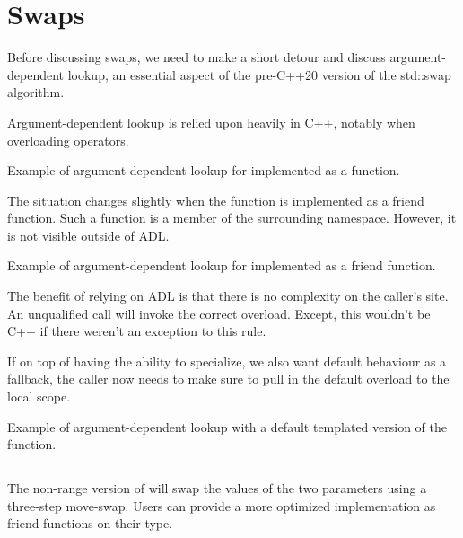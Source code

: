 \section{Swaps}

Before discussing swaps, we need to make a short detour and discuss argument-dependent lookup, an essential aspect of the pre-C++20 version of the std::swap algorithm.

Argument-dependent lookup is relied upon heavily in C++, notably when overloading operators.

\begin{box-note}
\footnotesize Example of argument-dependent lookup for  implemented as a function.
\tcblower
{}
\end{box-note}

The situation changes slightly when the function is implemented as a friend function. Such a function is a member of the surrounding namespace. However, it is not visible outside of ADL.

\begin{box-note}
\footnotesize Example of argument-dependent lookup for  implemented as a friend function.
\tcblower
{}
\end{box-note}

The benefit of relying on ADL is that there is no complexity on the caller's site. An unqualified call will invoke the correct overload. Except, this wouldn't be C++ if there weren't an exception to this rule.

If on top of having the ability to specialize, we also want default behaviour as a fallback, the caller now needs to make sure to pull in the default overload to the local scope.

\begin{box-note}
\footnotesize Example of argument-dependent lookup with a default templated version of the function.
\tcblower
{}
\end{box-note}

\subsection{\texorpdfstring{}{\texttt{std::swap}}}

The non-range version of  will swap the values of the two parameters using a three-step move-swap. Users can provide a more optimized implementation as friend functions on their type.

